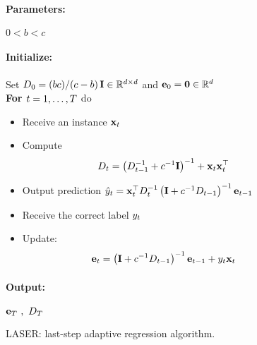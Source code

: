 \begin{figure}[t!]
{
\paragraph{Parameters:} $0<b<c$
\paragraph{Initialize:} Set
$D_{0}=(bc)/(c-b)\,\mathbf{I}\in\mathbb{R}^{d\times d}$ and $\mathbf{e}_{0}={\boldsymbol{0}}\in\mathbb{R}^d$\\
{\bf For $t=1 , \ldots , T$} do
\begin{itemize}
\nolineskips
\item Receive an instance $\mathbf{x}_{t}$
\item Compute
\begin{align*}
  D_{t}=\left(D_{t-1}^{-1}+c^{-1}\mi\right)^{-1}+\vxi{t}\vxti{t}
  \hfill
\end{align*}
\item Output  prediction $\hat{y}_{t}={\mathbf{x}}^{\top}_{t}D_{t}^{-1}\left(\mathbf{I}+c^{-1}D_{t-1}\right)^{-1}\mathbf{e}_{t-1}$
\item Receive the correct label $y_{t}$
\item
Update:
\begin{align*}
\vei{t}=\left(\mi+c^{-1}D_{t-1}\right)^{-1}\vei{t-1}+y_{t}\vxi{t}
\hfill
\end{align*}
\end{itemize}
\paragraph{Output:}  $\mathbf{e}_{T} \ ,\ D_{T}$\\
}
\figline
\caption{LASER: last-step adaptive regression algorithm.}
\label{algorithm:laser}
\end{figure}

